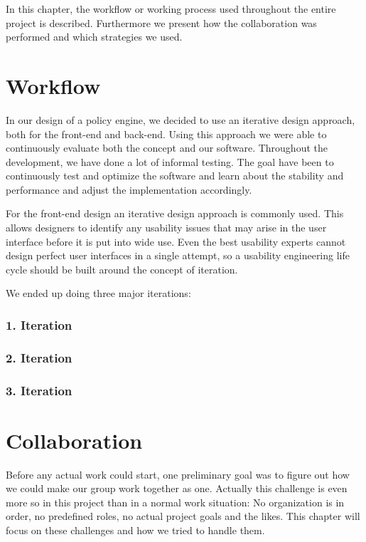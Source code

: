 In this chapter, the workflow or working process used throughout the entire project is described. Furthermore we present how the collaboration was performed and which strategies we used.

\section{Workflow} \label{sec:workflow}
In our design of a policy engine, we decided to use an iterative design approach, both for the front-end and back-end. Using this approach we were able to continuously evaluate both the concept and our software. Throughout the development, we have done a lot of informal testing. The goal have been to continuously test and optimize the software and learn about the stability and performance and adjust the implementation accordingly. 

For the front-end design an iterative design approach is commonly used. This allows designers to identify any usability issues that may arise in the user interface before it is put into wide use. Even the best usability experts cannot design perfect user interfaces in a single attempt, so a usability engineering life cycle should be built around the concept of iteration. \cite{Nielsen1993}

We ended up doing three major iterations:

\subsubsection{1. Iteration}



\subsubsection{2. Iteration}



\subsubsection{3. Iteration}




\section{Collaboration} \label{sec:collaboration}
Before any actual work could start, one preliminary goal was to figure out how we could make our group work together as one. Actually this challenge is even more so in this project than in a normal work situation: No organization is in order, no predefined roles, no actual project goals and the likes. This chapter will focus on these challenges and how we tried to handle them. 

